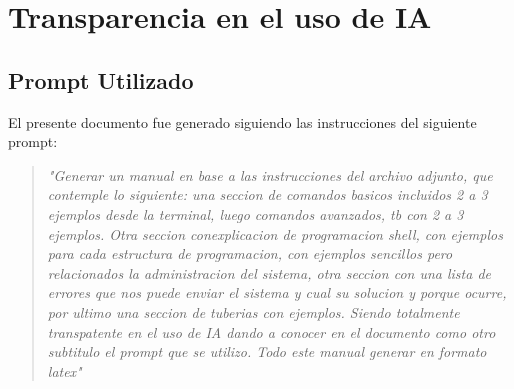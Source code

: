 \documentclass[a4paper,12pt]{article}
\begin{document}
\section{Transparencia en el uso de IA}
\subsection{Prompt Utilizado}
El presente documento fue generado siguiendo las instrucciones del siguiente prompt: 
\begin{quote}
    \textit{"Generar un manual en base a las instrucciones del archivo adjunto, que contemple lo siguiente: una seccion de comandos basicos incluidos 2 a 3 ejemplos desde la terminal, luego comandos avanzados, tb con 2 a 3 ejemplos. Otra seccion conexplicacion de programacion shell, con ejemplos para cada estructura de programacion, con ejemplos sencillos pero relacionados la administracion del sistema, otra seccion con una lista de errores que nos puede enviar el sistema y cual su solucion y porque ocurre, por ultimo una seccion de tuberias con ejemplos. Siendo totalmente transpatente en el uso de IA dando a conocer en el documento como otro subtitulo el prompt que se utilizo. Todo este manual generar en formato latex"}
\end{quote}
\end{document}
